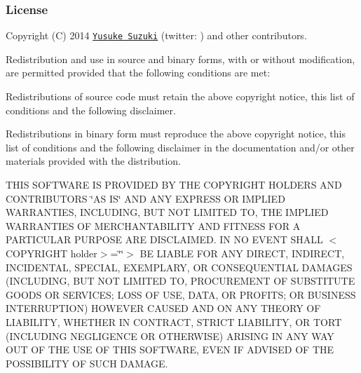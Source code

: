 \subsubsection*{License}

Copyright (C) 2014 \href{https://github.com/Constellation}{\tt Yusuke Suzuki} (twitter\+: \href{https://twitter.com/Constellation}{\tt }) and other contributors.

Redistribution and use in source and binary forms, with or without modification, are permitted provided that the following conditions are met\+:


\begin{DoxyItemize}
\item Redistributions of source code must retain the above copyright notice, this list of conditions and the following disclaimer.
\item Redistributions in binary form must reproduce the above copyright notice, this list of conditions and the following disclaimer in the documentation and/or other materials provided with the distribution.
\end{DoxyItemize}

T\+H\+IS S\+O\+F\+T\+W\+A\+RE IS P\+R\+O\+V\+I\+D\+ED BY T\+HE C\+O\+P\+Y\+R\+I\+G\+HT H\+O\+L\+D\+E\+RS A\+ND C\+O\+N\+T\+R\+I\+B\+U\+T\+O\+RS \char`\"{}\+A\+S I\+S\char`\"{} A\+ND A\+NY E\+X\+P\+R\+E\+SS OR I\+M\+P\+L\+I\+ED W\+A\+R\+R\+A\+N\+T\+I\+ES, I\+N\+C\+L\+U\+D\+I\+NG, B\+UT N\+OT L\+I\+M\+I\+T\+ED TO, T\+HE I\+M\+P\+L\+I\+ED W\+A\+R\+R\+A\+N\+T\+I\+ES OF M\+E\+R\+C\+H\+A\+N\+T\+A\+B\+I\+L\+I\+TY A\+ND F\+I\+T\+N\+E\+SS F\+OR A P\+A\+R\+T\+I\+C\+U\+L\+AR P\+U\+R\+P\+O\+SE A\+RE D\+I\+S\+C\+L\+A\+I\+M\+ED. IN NO E\+V\+E\+NT S\+H\+A\+LL $<$\+C\+O\+P\+Y\+R\+I\+G\+H\+T holder$>$=\char`\"{}\char`\"{}$>$ BE L\+I\+A\+B\+LE F\+OR A\+NY D\+I\+R\+E\+CT, I\+N\+D\+I\+R\+E\+CT, I\+N\+C\+I\+D\+E\+N\+T\+AL, S\+P\+E\+C\+I\+AL, E\+X\+E\+M\+P\+L\+A\+RY, OR C\+O\+N\+S\+E\+Q\+U\+E\+N\+T\+I\+AL D\+A\+M\+A\+G\+ES (I\+N\+C\+L\+U\+D\+I\+NG, B\+UT N\+OT L\+I\+M\+I\+T\+ED TO, P\+R\+O\+C\+U\+R\+E\+M\+E\+NT OF S\+U\+B\+S\+T\+I\+T\+U\+TE G\+O\+O\+DS OR S\+E\+R\+V\+I\+C\+ES; L\+O\+SS OF U\+SE, D\+A\+TA, OR P\+R\+O\+F\+I\+TS; OR B\+U\+S\+I\+N\+E\+SS I\+N\+T\+E\+R\+R\+U\+P\+T\+I\+ON) H\+O\+W\+E\+V\+ER C\+A\+U\+S\+ED A\+ND ON A\+NY T\+H\+E\+O\+RY OF L\+I\+A\+B\+I\+L\+I\+TY, W\+H\+E\+T\+H\+ER IN C\+O\+N\+T\+R\+A\+CT, S\+T\+R\+I\+CT L\+I\+A\+B\+I\+L\+I\+TY, OR T\+O\+RT (I\+N\+C\+L\+U\+D\+I\+NG N\+E\+G\+L\+I\+G\+E\+N\+CE OR O\+T\+H\+E\+R\+W\+I\+SE) A\+R\+I\+S\+I\+NG IN A\+NY W\+AY O\+UT OF T\+HE U\+SE OF T\+H\+IS S\+O\+F\+T\+W\+A\+RE, E\+V\+EN IF A\+D\+V\+I\+S\+ED OF T\+HE P\+O\+S\+S\+I\+B\+I\+L\+I\+TY OF S\+U\+CH D\+A\+M\+A\+GE. 